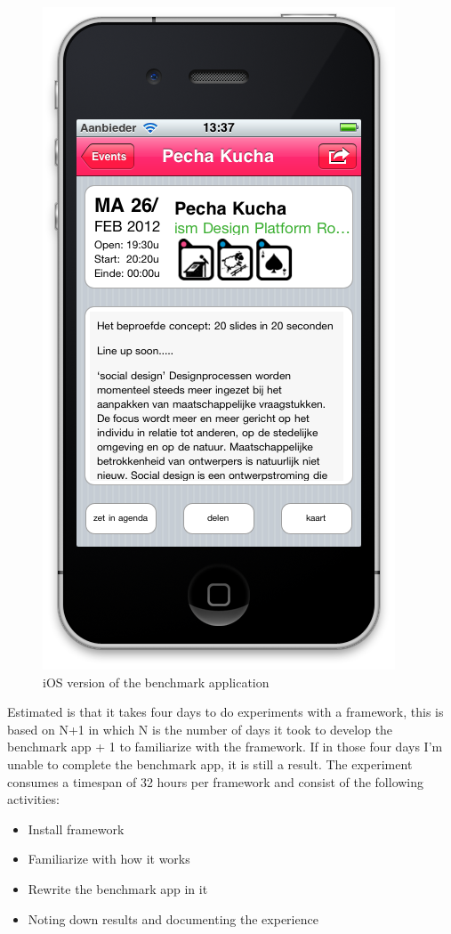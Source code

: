 \begin{figure}
\begin{minipage}{2.2in}
		\includegraphics[scale=0.15]{images/benchmarkapp02.png}
	\end{minipage}%
	\caption{iOS version of the benchmark application}%
	\label{fig:1figs}%
\end{figure}



Estimated is that it takes four days to do experiments with a framework, this is based on N+1 in which N is the number of days it took to develop the benchmark app + 1 to familiarize with the framework. If in those four days I'm unable to complete the benchmark app, it is still a result. The experiment consumes a timespan of 32 hours per framework and consist of the following activities:

\begin{itemize}
	\item Install framework
	\item Familiarize with how it works
	\item Rewrite the benchmark app in it
	\item Noting down results and documenting the experience
\end{itemize}

